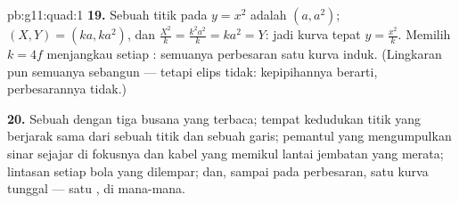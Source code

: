 \begin{solution}{pb:g11:quad:1}
\textbf{19.} Sebuah titik pada $y = x^2$ adalah $(a, a^2)$; 
$(X, Y) = (ka, ka^2)$, dan $\frac{X^2}{k} = \frac{k^2a^2}{k} =
ka^2 = Y$: jadi kurva  tepat $y = \frac{x^2}{k}$.
Memilih $k = 4f$ menjangkau setiap : semuanya
perbesaran satu kurva induk. (Lingkaran pun semuanya sebangun
--- tetapi elips tidak: kepipihannya berarti, perbesarannya tidak.)

\textbf{20.} Sebuah  dengan tiga busana yang terbaca; tempat
kedudukan titik yang berjarak sama dari sebuah titik dan sebuah garis;
pemantul yang mengumpulkan sinar sejajar di fokusnya dan kabel yang
memikul lantai jembatan yang merata; lintasan setiap bola yang dilempar;
dan, sampai pada perbesaran, satu kurva tunggal --- satu ,
di mana-mana.

\end{solution}
